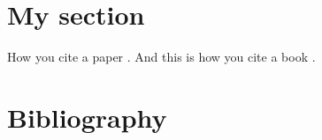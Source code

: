 \documentclass{article}
\let\origsection\section%
\let\section\subsection%
\let\section\origsection%
\begin{document}
\section{My section}
How you cite a paper . And this is how you cite a book .
\section{Bibliography}


\end{document}
